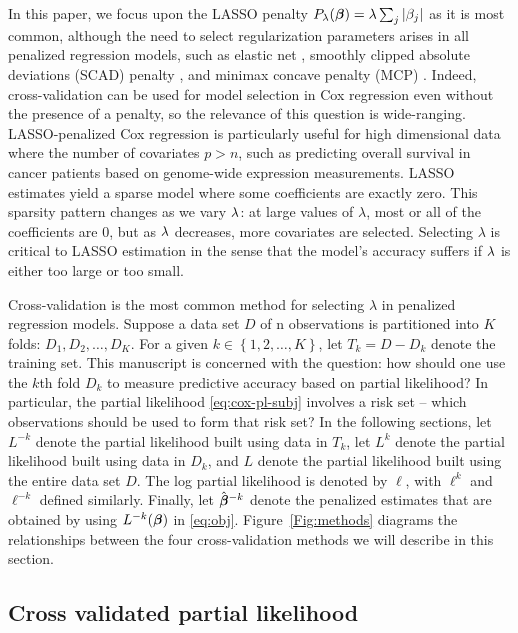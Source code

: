 In this paper, we focus upon the LASSO penalty $P_{\lambda}(\boldsymbol{\beta}) = \lambda \sum_{j} |\beta_{j}|$ as it is most common, although the need to select regularization parameters arises in all penalized regression models, such as elastic net \citep{Zou2005}, smoothly clipped absolute deviations (SCAD) penalty \citep{FanLi2001}, and minimax concave penalty (MCP) \citep{Zhang2010}. Indeed, cross-validation can be used for model selection in Cox regression even without the presence of a penalty, so the relevance of this question is wide-ranging. LASSO-penalized Cox regression is particularly useful for high dimensional data where the number of covariates $p > n$, such as predicting overall survival in cancer patients based on genome-wide expression measurements. LASSO estimates yield a sparse model where some coefficients are exactly zero. This sparsity pattern changes as we vary $\lambda$: at large values of $\lambda$, most or all of the coefficients are 0, but as $\lambda$ decreases, more covariates are selected. Selecting $\lambda$ is critical to LASSO estimation in the sense that the model's accuracy suffers if $\lambda$ is either too large or too small. 

Cross-validation is the most common method for selecting $\lambda$ in penalized regression models. Suppose a data set $D$ of n observations is partitioned into $K$ folds: $D_{1}, D_{2}, \ldots, D_{K}$. For a given $k \in \left\{1,2,\ldots, K\right\}$, let $T_{k} = D - D_{k}$ denote the training set. This manuscript is concerned with the question: how should one use the $k$th fold $D_{k}$ to measure predictive accuracy based on partial likelihood? In particular, the partial likelihood \eqref{eq:cox-pl-subj} involves a risk set -- which observations should be used to form that risk set?  In the following sections, let $L^{-k}$ denote the partial likelihood built using data in $T_k$, let $L^{k}$ denote the partial likelihood built using data in $D_k$, and $L$ denote the partial likelihood built using the entire data set $D$.  The log partial likelihood is denoted by $\ell$, with $\ell^k$ and $\ell^{-k}$ defined similarly. Finally, let $\bbh^{-k}$ denote the penalized estimates that are obtained by using $L^{-k}(\boldsymbol{\beta})$ in \eqref{eq:obj}.  Figure~\ref{Fig:methods} diagrams the relationships between the four cross-validation methods we will describe in this section.

\subsection{Cross validated partial likelihood} 
\label{Sec:cox-cv-existing}

